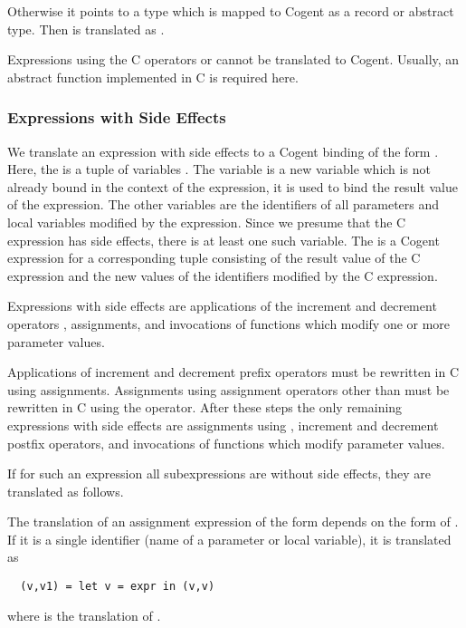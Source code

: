Otherwise it points to a type which is mapped to Cogent as a record or abstract type. Then  is translated as . 

Expressions using the C operators  or  cannot be translated to Cogent. Usually, an abstract
function implemented in C is required here.

\subsubsection{Expressions with Side Effects}

We translate an expression with side effects to a Cogent binding of the form . Here, the
 is a tuple of variables . The variable  is a
new variable which is not already bound in the context of the expression, it is used to bind the result value of the
expression. The other variables are the identifiers of all parameters and local 
variables modified by the expression. Since we presume that the C expression has side effects, there is at least one
such variable.
The  is a Cogent expression for a corresponding tuple consisting of the result value of the C expression and the new values
of the identifiers modified by the C expression.

Expressions with side effects are applications of the increment and decrement operators \code{++,-{}-}, assignments,
and invocations of functions which modify one or more parameter values.

Applications of increment and decrement prefix operators must be rewritten in C using assignments. Assignments using assignment
operators other than \code{=} must be rewritten in C using the \code{=} operator. After these steps the only 
remaining expressions with side effects are assignments using \code{=}, increment and decrement postfix operators, 
and invocations of functions which modify parameter values.

If for such an expression all subexpressions are without side effects, they are translated as follows. 

The translation of an assignment expression of the form  depends on the form of . If it is
a single identifier  (name of a parameter or local variable), it is translated as
\begin{verbatim}
  (v,v1) = let v = expr in (v,v)
\end{verbatim}
where  is the translation of .

